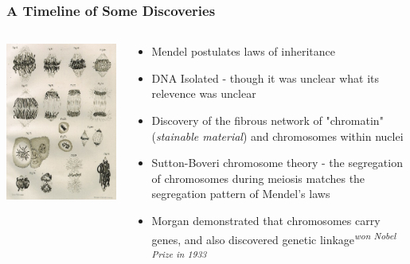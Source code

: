 \documentclass{beamer}
\begin{document}
\begin{frame}
	\frametitle{A Timeline of Some Discoveries}
	
	\begin{columns}
\begin{column}{0.4\textwidth}
	\includegraphics[keepaspectratio, width  =\textwidth]{img/chromosomes}
\end{column}
	\begin{column}{0.6\textwidth}
		\begin{itemize}
			\small
		\item[1865]  Mendel postulates laws of inheritance \pause
		\item[1869]  DNA Isolated - though it was unclear what its relevence was unclear \pause
		\item[1882] Discovery of the fibrous network of "chromatin" (\textit{stainable material}) and chromosomes within nuclei \pause
		\item[1902-6]  Sutton-Boveri chromosome theory - the segregation of chromosomes during meiosis matches the segregation pattern of Mendel’s laws \pause
		\item[1915] Morgan demonstrated that chromosomes carry genes, and also discovered genetic linkage\textsuperscript{\textit{won Nobel Prize in 1933}}


\end{itemize}
\end{column}
\end{columns}
\end{frame}
\end{document}
